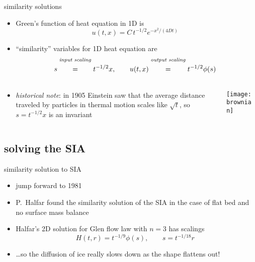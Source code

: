 \begin{frame}{similarity solutions}

\begin{itemize}
\item Green's function of heat equation in 1D is
	$$u(t,x) = C\, t^{-1/2} e^{-x^2/(4Dt)}$$
\item ``similarity'' variables for 1D heat equation are
	$$s \stackrel{\text{\emph{input scaling}}}{\phantom{\Big|}=\phantom{\Big|}} t^{-1/2} x, \qquad u(t,x) \stackrel{\text{\emph{output scaling}}}{\phantom{\Big|}=\phantom{\Big|}} t^{-1/2} \phi(s)$$
\end{itemize}
\begin{columns}
\begin{column}{0.6\textwidth}
\begin{itemize}
\item \emph{historical note}:  in 1905 Einstein saw that the average distance traveled by particles in thermal motion scales like $\sqrt{t}$, so $s = t^{-1/2}x$ is an invariant
\end{itemize}
\end{column}
\begin{column}{0.4\textwidth}
\begin{center}
\texttt{[image: brownian]}
\end{center}
\end{column}
\end{columns}

\end{frame}


\subsection{solving the SIA}

\begin{frame}{similarity solution to SIA}

\begin{itemize}
\item jump forward to 1981
\item P.~Halfar found the similarity solution of the SIA in the case of flat bed and no surface mass balance
\item Halfar's 2D solution for Glen flow law with $n=3$ has scalings
   $$H(t,r)=t^{-1/9} \phi(s), \qquad s = t^{-1/18} r$$
\item \dots so the diffusion of ice really slows down as the shape flattens out!
\end{itemize}
\end{frame}


